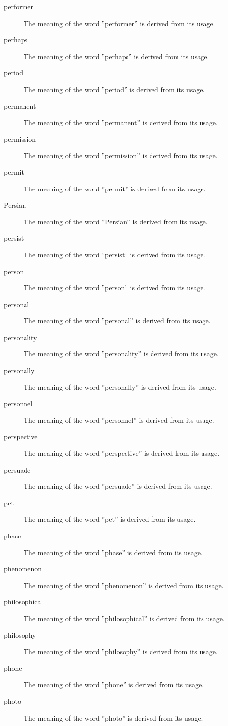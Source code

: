 \documentclass[12pt, letterpaper]{memoir}
\begin{document}
\begin{description}
\item[performer] The meaning of the word ''performer'' is derived from its usage.
\item[perhaps] The meaning of the word ''perhaps'' is derived from its usage.
\item[period] The meaning of the word ''period'' is derived from its usage.
\item[permanent] The meaning of the word ''permanent'' is derived from its usage.
\item[permission] The meaning of the word ''permission'' is derived from its usage.
\item[permit] The meaning of the word ''permit'' is derived from its usage.
\item[Persian] The meaning of the word ''Persian'' is derived from its usage.
\item[persist] The meaning of the word ''persist'' is derived from its usage.
\item[person] The meaning of the word ''person'' is derived from its usage.
\item[personal] The meaning of the word ''personal'' is derived from its usage.
\item[personality] The meaning of the word ''personality'' is derived from its usage.
\item[personally] The meaning of the word ''personally'' is derived from its usage.
\item[personnel] The meaning of the word ''personnel'' is derived from its usage.
\item[perspective] The meaning of the word ''perspective'' is derived from its usage.
\item[persuade] The meaning of the word ''persuade'' is derived from its usage.
\item[pet] The meaning of the word ''pet'' is derived from its usage.
\item[phase] The meaning of the word ''phase'' is derived from its usage.
\item[phenomenon] The meaning of the word ''phenomenon'' is derived from its usage.
\item[philosophical] The meaning of the word ''philosophical'' is derived from its usage.
\item[philosophy] The meaning of the word ''philosophy'' is derived from its usage.
\item[phone] The meaning of the word ''phone'' is derived from its usage.
\item[photo] The meaning of the word ''photo'' is derived from its usage.

\end{description}
\end{document}
